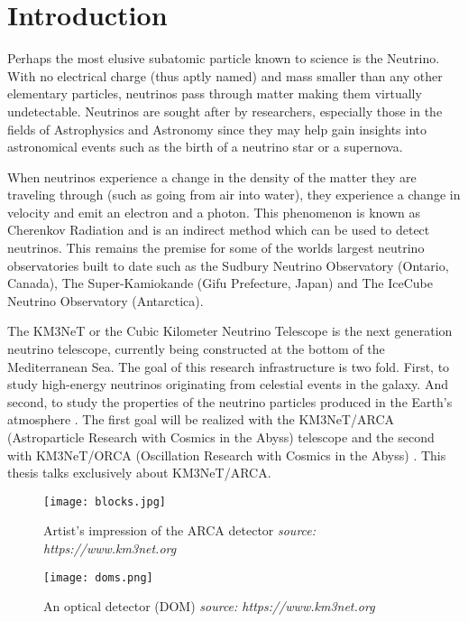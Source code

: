 
\chapter{Introduction}
\label{cha:intro}

Perhaps the most elusive subatomic particle known to science is the
Neutrino. With no electrical charge (thus aptly named) and mass
smaller than any other elementary particles, neutrinos pass through
matter making them virtually undetectable. Neutrinos are sought after
by researchers, especially those in the fields of Astrophysics and
Astronomy since they may help gain insights into astronomical events
such as the birth of a neutrino star or a supernova.

When neutrinos experience a change in the density of the matter they
are traveling through (such as going from air into water), they
experience a change in velocity and emit an electron and a photon.
This phenomenon is known as Cherenkov Radiation
\cite{margiotta2014km3net} and is an indirect method which can be used
to detect neutrinos. This remains the premise for some of the worlds
largest neutrino observatories built to date such as the Sudbury
Neutrino Observatory (Ontario, Canada), The Super-Kamiokande (Gifu
Prefecture, Japan) and The IceCube Neutrino Observatory (Antarctica).

The KM3NeT or the Cubic Kilometer Neutrino Telescope is the next
generation neutrino telescope, currently being constructed at the
bottom of the Mediterranean Sea. The goal of this research
infrastructure is two fold. First, to study high-energy neutrinos
originating from celestial events in the galaxy. And second, to study
the properties of the neutrino particles produced in the Earth's
atmosphere \cite{adrian2016letter}. The first goal will be realized
with the KM3NeT/ARCA (Astroparticle Research with Cosmics in the
Abyss) telescope and the second with KM3NeT/ORCA (Oscillation Research
with Cosmics in the Abyss) \cite{adrian2016letter}. This thesis talks
exclusively about KM3NeT/ARCA.

\begin{figure}[htb]
  \centering
  \begin{minipage}{0.74\textwidth}
    \texttt{[image: blocks.jpg]}
    \caption{Artist's impression of the ARCA detector \textit{source: https://www.km3net.org}}%
    \label{fig:blocks}    
  \end{minipage}
  \begin{minipage}{0.24\textwidth}
    \texttt{[image: doms.png]}
    \caption{An optical detector (DOM) \textit{source: https://www.km3net.org}}%
    \label{fig:doms}    
  \end{minipage}
\end{figure}


